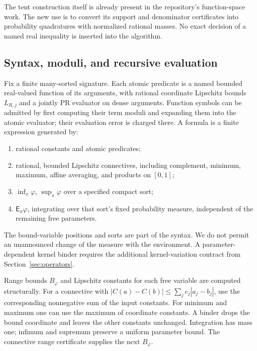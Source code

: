 The tent construction itself is already present in the repository's
function-space work. The new use is to convert its support and denominator
certificates into probability quadratures with normalized rational masses.
No exact decision of a named real inequality is inserted into the algorithm.

\subsection{Syntax, moduli, and recursive evaluation}

Fix a finite many-sorted signature. Each atomic predicate is a named
bounded real-valued function of its arguments, with rational coordinate
Lipschitz bounds $L_{R,j}$ and a jointly PR evaluator on dense arguments.
Function symbols can be admitted by first computing their term moduli and
expanding them into the atomic evaluator; their evaluation error is charged
there. A formula is a finite expression generated by:
\begin{enumerate}
\item rational constants and atomic predicates;
\item rational, bounded Lipschitz connectives, including complement,
      minimum, maximum, affine averaging, and products on $[0,1]$;
\item $\inf_x\varphi$, $\sup_x\varphi$ over a specified compact sort;
\item $\mathsf E_x\varphi$, integrating over that sort's fixed probability
      measure, independent of the remaining free parameters.
\end{enumerate}
The bound-variable positions and sorts are part of the syntax. We do not
permit an unannounced change of the measure with the environment. A
parameter-dependent kernel binder requires the additional kernel-variation
contract from Section~\ref{sec:operators}.

Range bounds $B_\varphi$ and Lipschitz constants for each free variable are
computed structurally. For a connective with
$|C(a)-C(b)|\le\sum_jc_j|a_j-b_j|$, use the corresponding nonnegative
sum of the input constants. For minimum and maximum one can use the
maximum of coordinate constants. A binder drops the bound coordinate
and leaves the other constants unchanged. Integration has mass one;
infimum and supremum preserve a uniform parameter bound. The connective
range certificate supplies the next $B_\varphi$.

